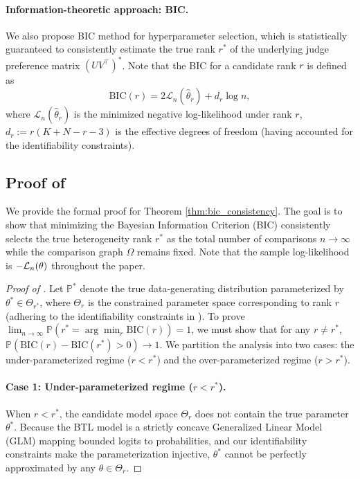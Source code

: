 \documentclass{article}
\begin{document}
\begin{bibunit}[unsrtnat]
\paragraph{Information-theoretic approach: BIC.}

We also propose BIC method for hyperparameter selection, which is statistically guaranteed to consistently estimate the true rank $r^*$ of the underlying judge preference matrix $(UV^\top)^*$.
Note that the BIC for a candidate rank $r$ is defined as
\begin{equation} \label{eq:BIC}
    \text{BIC}(r) = 2 \mathcal{L}_n(\hat{\theta}_r) + d_r \log n,
\end{equation}
where $\mathcal{L}_n(\hat{\theta}_r)$ is the minimized negative log-likelihood under rank $r$, $d_r := r(K + N - r-3)$ is the effective degrees of freedom (having accounted for the identifiability constraints).


\subsection[Proof of Theorem \ref{thm:bic_consistency}]{Proof of }\label{app:subsec:bic_proof}
We provide the formal proof for Theorem \ref{thm:bic_consistency}. The goal is to show that minimizing the Bayesian Information Criterion (BIC) consistently selects the true heterogeneity rank $r^*$ as the total number of comparisons $n \to \infty$ while the comparison graph $\Omega$ remains fixed. Note that the sample log-likelihood is $-\mathcal{L}_n(\theta)$ throughout the paper.

\begin{proof}[Proof of ]
Let $\mathbb{P}^*$ denote the true data-generating distribution parameterized by $\theta^* \in \Theta_{r^*}$, where $\Theta_r$ is the constrained parameter space corresponding to rank $r$ (adhering to the identifiability constraints in ). 
To prove $\lim_{n \to \infty} \mathbb{P}\left(r^*=\arg\min_r \text{BIC}(r)\right) = 1$, we must show that for any $r \neq r^*$, $\mathbb{P}\left(\text{BIC}(r) - \text{BIC}(r^*) > 0\right) \to 1$. We partition the analysis into two cases: the under-parameterized regime ($r < r^*$) and the over-parameterized regime ($r > r^*$).

\paragraph{Case 1: Under-parameterized regime ($r < r^*$).}
When $r < r^*$, the candidate model space $\Theta_r$ does not contain the true parameter $\theta^*$. Because the BTL model is a strictly concave Generalized Linear Model (GLM) mapping bounded logits to probabilities, and our identifiability constraints make the parameterization injective, $\theta^*$ cannot be perfectly approximated by any $\theta \in \Theta_r$. 


\end{proof}
\end{bibunit}
\end{document}
